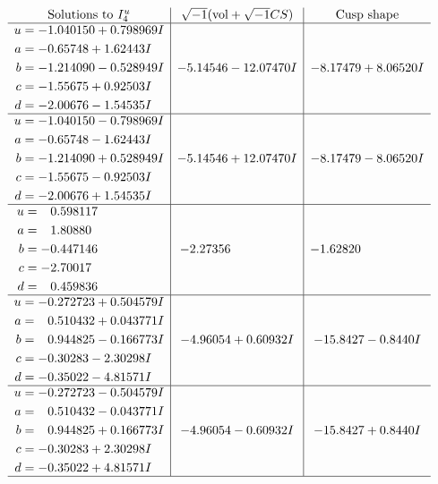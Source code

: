 \documentclass[1p]{elsarticle_modified}
\theoremstyle{definition}
\newcommand{\I}{\sqrt{-1}}
\begin{document}
$$\begin{array}{c|c|c}
\text{Solutions to }I^u_{4}& \I (\text{vol} + \sqrt{-1}CS) & \text{Cusp shape}\\
 \hline 
\begin{aligned}
u &= -1.040150 + 0.798969 I \\
a &= -0.65748 + 1.62443 I \\
b &= -1.214090 - 0.528949 I \\
c &= -1.55675 + 0.92503 I \\
d &= -2.00676 - 1.54535 I\end{aligned}
 & -5.14546 - 12.07470 I & -8.17479 + 8.06520 I \\ \hline\begin{aligned}
u &= -1.040150 - 0.798969 I \\
a &= -0.65748 - 1.62443 I \\
b &= -1.214090 + 0.528949 I \\
c &= -1.55675 - 0.92503 I \\
d &= -2.00676 + 1.54535 I\end{aligned}
 & -5.14546 + 12.07470 I & -8.17479 - 8.06520 I \\ \hline\begin{aligned}
u &= \phantom{-}0.598117\phantom{ +0.000000I} \\
a &= \phantom{-}1.80880\phantom{ +0.000000I} \\
b &= -0.447146\phantom{ +0.000000I} \\
c &= -2.70017\phantom{ +0.000000I} \\
d &= \phantom{-}0.459836\phantom{ +0.000000I}\end{aligned}
 & -2.27356\phantom{ +0.000000I} & -1.62820\phantom{ +0.000000I} \\ \hline\begin{aligned}
u &= -0.272723 + 0.504579 I \\
a &= \phantom{-}0.510432 + 0.043771 I \\
b &= \phantom{-}0.944825 - 0.166773 I \\
c &= -0.30283 - 2.30298 I \\
d &= -0.35022 - 4.81571 I\end{aligned}
 & -4.96054 + 0.60932 I & -15.8427 - 0.8440 I \\ \hline\begin{aligned}
u &= -0.272723 - 0.504579 I \\
a &= \phantom{-}0.510432 - 0.043771 I \\
b &= \phantom{-}0.944825 + 0.166773 I \\
c &= -0.30283 + 2.30298 I \\
d &= -0.35022 + 4.81571 I\end{aligned}
 & -4.96054 - 0.60932 I & -15.8427 + 0.8440 I\\
 \hline 
 \end{array}$$\newpage\newpage\renewcommand{\arraystretch}{1}
\end{document}

